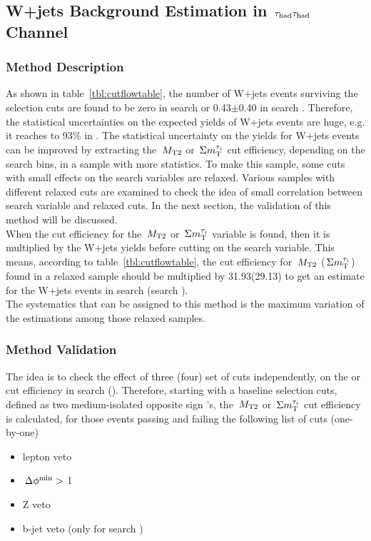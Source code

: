 \subsection{\texorpdfstring{W+jets Background Estimation in $\,\tau_{\rm had}\tau_{\rm had}$ Channel}{W+jets Background Estimation in tau-tau Channel}}
\subsubsection{Method Description}
As shown in table~\ref{tbl:cutflowtable}, the number of W+jets events surviving 
the selection cuts are found to be zero in search \binone or 0.43$\pm$0.40 in search \bintwo. 
Therefore, the statistical uncertainties on the expected yields of W+jets events
are huge, e.g. it reaches to 93\% in \bintwo. 
 The statistical uncertainty on the yields for W+jets events can be improved by extracting 
the $\,{M_{\rm T2}}$ or $\,\Sigma m_{\rm T}^{\tau_i}$ cut efficiency, depending on the search bins, in a sample with more 
statistics. To make this sample, some cuts with small effects on the search variables are 
relaxed. Various samples with different relaxed cuts are examined to check the idea of small correlation 
between search variable and relaxed cuts. In the next section, the validation of this method will be discussed.\\
When the cut efficiency for the $\,{M_{\rm T2}}$ or $\,\Sigma m_{\rm T}^{\tau_i}$ variable is found, then it is multiplied by the W+jets 
yields before cutting on the search variable. This means, according to table~\ref{tbl:cutflowtable}, the cut efficiency for 
$\,{M_{\rm T2}}$ ($\,\Sigma m_{\rm T}^{\tau_i}$) found in a relaxed sample should be multiplied by 31.93(29.13) to get an 
estimate for the W+jets events in search \binone (search \bintwo).\\
The systematics that can be assigned to this method is the maximum
variation of the estimations among those relaxed samples.
\subsubsection{Method Validation}
The idea is to check the effect of three (four) set of cuts independently, 
on the \mttwo or \SumMT cut efficiency in search \binone (\bintwo). 
Therefore, starting with a baseline selection cuts, defined as two 
medium-isolated opposite sign \Tau's, the $\,{M_{\rm T2}}$ or $\,\Sigma m_{\rm T}^{\tau_i}$ cut 
efficiency is calculated, for those events passing and failing the following list of cuts (one-by-one)
\begin{itemize}
\item lepton veto
\item $\,{\Delta\phi^{\rm min}}>$ 1
\item Z veto 
\item b-jet veto (only for search \bintwo)
\end{itemize}

